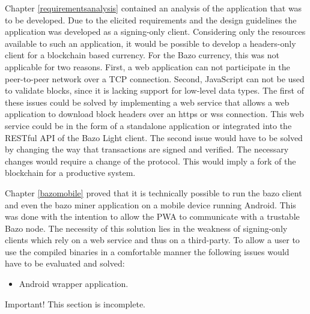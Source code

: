 Chapter \ref{requirementsanalysis} contained an analysis of the application that was to be developed. Due to the elicited requirements and the design guidelines the application was developed as a signing-only client. Considering only the resources available to such an application, it would be possible to develop a headers-only client for a blockchain based currency. For the Bazo currency, this was not applicable for two reasons. First, a web application can not participate in the peer-to-peer network over a TCP connection. Second, JavaScript can not be used to validate blocks, since it is lacking support for low-level data types. The first of these issues could be solved by implementing a web service that allows a web application to download block headers over an https or wss connection. This web service could be in the form of a standalone application or integrated into the RESTful API of the Bazo Light client. The second issue would have to be solved by changing the way that transactions are signed and verified. The necessary changes would require a change of the protocol. This would imply a fork of the blockchain for a productive system.

Chapter \ref{bazomobile} proved that it is technically possible to run the bazo client and even the bazo miner application on a mobile device running Android. This was done with the intention to allow the PWA to communicate with a trustable Bazo node. The necessity of this solution lies in the weakness of signing-only clients which rely on a web service and thus on a third-party. To allow a user to use the compiled binaries in a comfortable manner the following issues would have to be evaluated and solved:
\begin{itemize}
\item Android wrapper application.
\end{itemize}
\begin{bclogo}[logo=\bcattention, couleurBarre=red, noborder=true, 
               couleur=LightSalmon]{Important!}
This section is incomplete.
\end{bclogo}